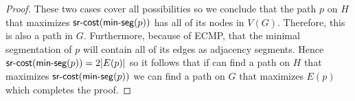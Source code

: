 \begin{proof}
These two cases cover all possibilities so we conclude that the path $p$ on $H$ that maximizes
$\textsf{sr-cost}(\textsf{min-seg}(p))$ has all of its nodes in $V(G)$. Therefore, this is also a path in $G$.
Furthermore, because of ECMP, that the minimal segmentation of $p$ will contain
all of its edges as adjacency segments. Hence $\textsf{sr-cost}(\textsf{min-seg}(p)) = 2 |E(p)|$ so it follows that
if can find a path on $H$ that maximizes $\textsf{sr-cost}(\textsf{min-seg}(p))$ we can find a path on $G$ that maximizes
$E(p)$ which completes the proof.
% 
% 
% 
% 
% 
% 
% 
% 
% 
% 
% 

\end{proof}

